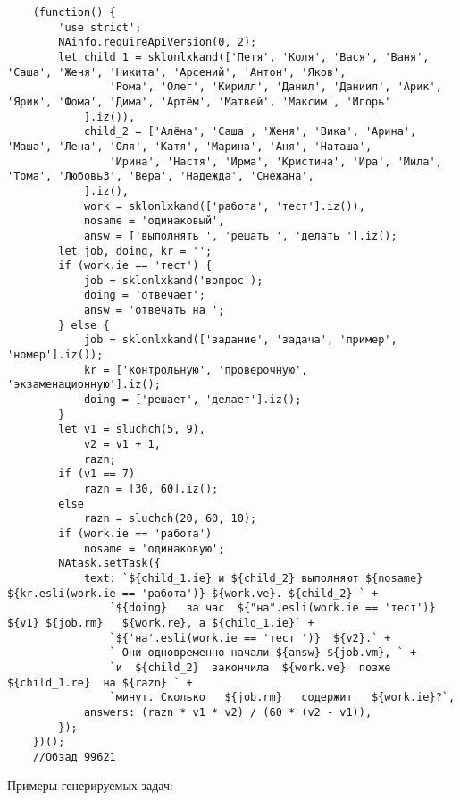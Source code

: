 \begin{lstlisting}
	(function() {
		'use strict';
		NAinfo.requireApiVersion(0, 2);
		let child_1 = sklonlxkand(['Петя', 'Коля', 'Вася', 'Ваня', 'Саша', 'Женя', 'Никита', 'Арсений', 'Антон', 'Яков',
				'Рома', 'Олег', 'Кирилл', 'Данил', 'Даниил', 'Арик', 'Ярик', 'Фома', 'Дима', 'Артём', 'Матвей', 'Максим', 'Игорь'
			].iz()),
			child_2 = ['Алёна', 'Саша', 'Женя', 'Вика', 'Арина', 'Маша', 'Лена', 'Оля', 'Катя', 'Марина', 'Аня', 'Наташа',
				'Ирина', 'Настя', 'Ирма', 'Кристина', 'Ира', 'Мила', 'Тома', 'Любовь3', 'Вера', 'Надежда', 'Снежана',
			].iz(),
			work = sklonlxkand(['работа', 'тест'].iz()),
			nosame = 'одинаковый',
			answ = ['выполнять ', 'решать ', 'делать '].iz();
		let job, doing, kr = '';
		if (work.ie == 'тест') {
			job = sklonlxkand('вопрос');
			doing = 'отвечает';
			answ = 'отвечать на ';
		} else {
			job = sklonlxkand(['задание', 'задача', 'пример', 'номер'].iz());
			kr = ['контрольную', 'проверочную', 'экзаменационную'].iz();
			doing = ['решает', 'делает'].iz();
		}
		let v1 = sluchch(5, 9),
			v2 = v1 + 1,
			razn;
		if (v1 == 7)
			razn = [30, 60].iz();
		else
			razn = sluchch(20, 60, 10);
		if (work.ie == 'работа')
			nosame = 'одинаковую';
		NAtask.setTask({
			text: `${child_1.ie} и ${child_2} выполняют ${nosame}  ${kr.esli(work.ie == 'работа')} ${work.ve}. ${child_2} ` +
				`${doing}   за час  ${"на".esli(work.ie == 'тест')} ${v1} ${job.rm}   ${work.re}, а ${child_1.ie}` +
				`${'на'.esli(work.ie == 'тест ')}  ${v2}.` +
				` Они одновременно начали ${answ} ${job.vm}, ` +
				`и  ${child_2}  закончила  ${work.ve}  позже  ${child_1.re}  на ${razn} ` +
				`минут. Сколько   ${job.rm}   содержит   ${work.ie}?`,
			answers: (razn * v1 * v2) / (60 * (v2 - v1)),
		});
	})();
	//Обзад 99621
\end{lstlisting}
Примеры генерируемых задач:

\vspace{\baselineskip}

\vspace{\baselineskip}

